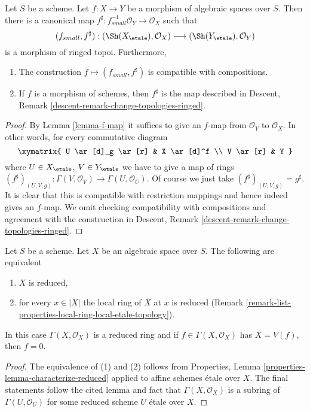 \begin{lemma}
\label{lemma-morphism-ringed-topoi}
Let $S$ be a scheme.
Let $f : X \to Y$ be a morphism of algebraic spaces over $S$.
Then there is a canonical map
$f^\sharp : f_{small}^{-1}\mathcal{O}_Y \to \mathcal{O}_X$ such that
$$
(f_{small}, f^\sharp) :
(\Sh(X_\etale), \mathcal{O}_X)
\longrightarrow
(\Sh(Y_\etale), \mathcal{O}_Y)
$$
is a morphism of ringed topoi. Furthermore,
\begin{enumerate}
\item The construction $f \mapsto (f_{small}, f^\sharp)$ is compatible with
compositions.
\item If $f$ is a morphism of schemes, then $f^\sharp$ is the map described in
Descent, Remark \ref{descent-remark-change-topologies-ringed}.
\end{enumerate}
\end{lemma}

\begin{proof}
By Lemma \ref{lemma-f-map} it suffices to give an $f$-map from
$\mathcal{O}_Y$ to $\mathcal{O}_X$. In other words, for every
commutative diagram
$$
\xymatrix{
U \ar[d]_g \ar[r] & X \ar[d]^f \\
V \ar[r] & Y
}
$$
where $U \in X_\etale$, $V \in Y_\etale$ we have to give a
map of rings
$
(f^\sharp)_{(U, V, g)} :
\Gamma(V, \mathcal{O}_V)
\to
\Gamma(U, \mathcal{O}_U).
$
Of course we just take $(f^\sharp)_{(U, V, g)} = g^\sharp$.
It is clear that this is compatible with restriction mappings
and hence indeed gives an $f$-map.
We omit checking compatibility with compositions and agreement with the
construction in
Descent, Remark \ref{descent-remark-change-topologies-ringed}.
\end{proof}

\begin{lemma}
\label{lemma-reduced-space}
Let $S$ be a scheme. Let $X$ be an algebraic space over $S$.
The following are equivalent
\begin{enumerate}
\item $X$ is reduced,
\item for every $x \in |X|$ the local ring of $X$ at $x$ is
reduced (Remark \ref{remark-list-properties-local-ring-local-etale-topology}).
\end{enumerate}
In this case $\Gamma(X, \mathcal{O}_X)$ is a reduced ring and
if $f \in \Gamma(X, \mathcal{O}_X)$ has $X = V(f)$, then $f = 0$.
\end{lemma}

\begin{proof}
The equivalence of (1) and (2) follows from
Properties, Lemma \ref{properties-lemma-characterize-reduced}
applied to affine schemes \'etale over $X$. The final statements
follow the cited lemma and fact that $\Gamma(X, \mathcal{O}_X)$ is
a subring of $\Gamma(U, \mathcal{O}_U)$ for some
reduced scheme $U$ \'etale over $X$.
\end{proof}







